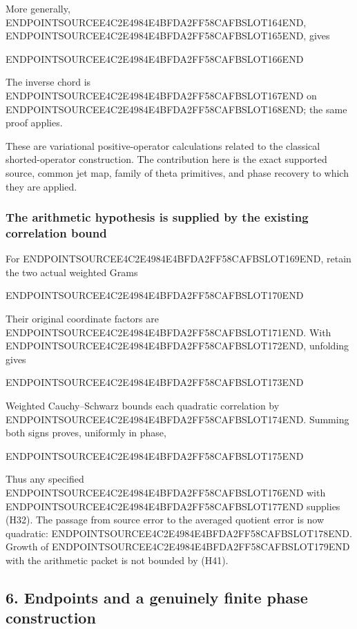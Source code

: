 More generally, ENDPOINTSOURCEE4C2E4984E4BFDA2FF58CAFBSLOT164END, ENDPOINTSOURCEE4C2E4984E4BFDA2FF58CAFBSLOT165END, gives

ENDPOINTSOURCEE4C2E4984E4BFDA2FF58CAFBSLOT166END

The inverse chord is ENDPOINTSOURCEE4C2E4984E4BFDA2FF58CAFBSLOT167END on ENDPOINTSOURCEE4C2E4984E4BFDA2FF58CAFBSLOT168END; the same proof applies.

These are variational positive-operator calculations related to the classical shorted-operator construction. The contribution here is the exact supported source, common jet map, family of theta primitives, and phase recovery to which they are applied.

\subsubsection{The arithmetic hypothesis is supplied by the existing correlation bound}\label{endpoint-holonomy_original--the-arithmetic-hypothesis-is-supplied-by-the-existing-correlation-bound}

For ENDPOINTSOURCEE4C2E4984E4BFDA2FF58CAFBSLOT169END, retain the two actual weighted Grams

ENDPOINTSOURCEE4C2E4984E4BFDA2FF58CAFBSLOT170END

Their original coordinate factors are ENDPOINTSOURCEE4C2E4984E4BFDA2FF58CAFBSLOT171END. With ENDPOINTSOURCEE4C2E4984E4BFDA2FF58CAFBSLOT172END, unfolding gives

ENDPOINTSOURCEE4C2E4984E4BFDA2FF58CAFBSLOT173END

Weighted Cauchy--Schwarz bounds each quadratic correlation by ENDPOINTSOURCEE4C2E4984E4BFDA2FF58CAFBSLOT174END. Summing both signs proves, uniformly in phase,

ENDPOINTSOURCEE4C2E4984E4BFDA2FF58CAFBSLOT175END

Thus any specified ENDPOINTSOURCEE4C2E4984E4BFDA2FF58CAFBSLOT176END with ENDPOINTSOURCEE4C2E4984E4BFDA2FF58CAFBSLOT177END supplies (H32). The passage from source error to the averaged quotient error is now quadratic: ENDPOINTSOURCEE4C2E4984E4BFDA2FF58CAFBSLOT178END. Growth of ENDPOINTSOURCEE4C2E4984E4BFDA2FF58CAFBSLOT179END with the arithmetic packet is not bounded by (H41).

\subsection{6. Endpoints and a genuinely finite phase construction}\label{endpoint-holonomy_original--endpoints-and-a-genuinely-finite-phase-construction}

